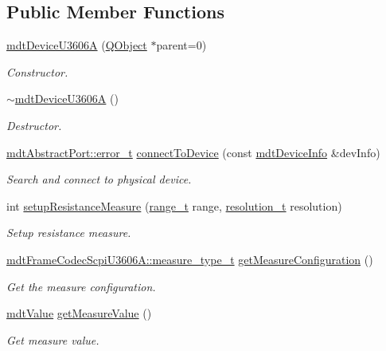 \subsection*{Public Member Functions}
\begin{DoxyCompactItemize}
\item 
\hyperlink{classmdt_device_u3606_a_a91201ae14df7b553a947b5857eaa1c65}{mdt\-Device\-U3606\-A} (\hyperlink{class_q_object}{Q\-Object} $\ast$parent=0)
\begin{DoxyCompactList}\small\item\em Constructor. \end{DoxyCompactList}\item 
\hyperlink{classmdt_device_u3606_a_a7d2fb26475e72cce95ca6be384d569b7}{$\sim$mdt\-Device\-U3606\-A} ()
\begin{DoxyCompactList}\small\item\em Destructor. \end{DoxyCompactList}\item 
\hyperlink{classmdt_abstract_port_ad4121bb930c95887e77f8bafa065a85e}{mdt\-Abstract\-Port\-::error\-\_\-t} \hyperlink{classmdt_device_u3606_a_acf3b48b13bc179ad4f94b3011b7d607a}{connect\-To\-Device} (const \hyperlink{classmdt_device_info}{mdt\-Device\-Info} \&dev\-Info)
\begin{DoxyCompactList}\small\item\em Search and connect to physical device. \end{DoxyCompactList}\item 
int \hyperlink{classmdt_device_u3606_a_a3ccd18368d0c1a2641e209a471e5753e}{setup\-Resistance\-Measure} (\hyperlink{classmdt_device_u3606_a_ae05c254d19a66c1728d30100f7c600dc}{range\-\_\-t} range, \hyperlink{classmdt_device_u3606_a_a1899206163f2a0163d09cbc482daf806}{resolution\-\_\-t} resolution)
\begin{DoxyCompactList}\small\item\em Setup resistance measure. \end{DoxyCompactList}\item 
\hyperlink{classmdt_frame_codec_scpi_u3606_a_a3d7a1de14d77797a08e3d2991fa9f004}{mdt\-Frame\-Codec\-Scpi\-U3606\-A\-::measure\-\_\-type\-\_\-t} \hyperlink{classmdt_device_u3606_a_a8732ec3f4a04a191585191e1ba4f190d}{get\-Measure\-Configuration} ()
\begin{DoxyCompactList}\small\item\em Get the measure configuration. \end{DoxyCompactList}\item 
\hyperlink{classmdt_value}{mdt\-Value} \hyperlink{classmdt_device_u3606_a_ae75a1a896f905487d080761a2b8cf5a5}{get\-Measure\-Value} ()
\begin{DoxyCompactList}\small\item\em Get measure value. \end{DoxyCompactList}\end{DoxyCompactItemize}
